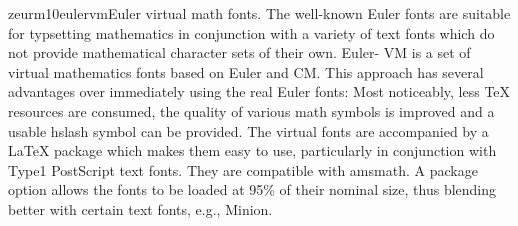 \documentclass{ddltxtyp}
\begin{document}
\begin{package}{zeurm10}{eulervm}{Euler virtual math fonts.}
The well-known Euler fonts are suitable for typsetting
mathematics in conjunction with a variety of text fonts which
do not provide mathematical character sets of their own. Euler-%
VM is a set of virtual mathematics fonts based on Euler and CM.
This approach has several advantages over immediately using the
real Euler fonts: Most noticeably, less {\TeX} resources are
consumed, the quality of various math symbols is improved and a
usable hslash symbol can be provided. The virtual fonts are
accompanied by a {\LaTeX} package which makes them easy to use,
particularly in conjunction with Type1 PostScript text fonts.
They are compatible with amsmath. A package option allows the
fonts to be loaded at 95{\%} of their nominal size, thus blending
better with certain text fonts, e.g., Minion.
\end{package}
\end{document}
